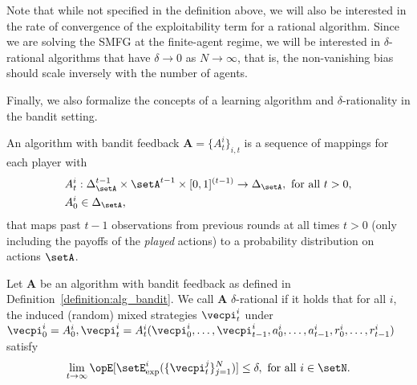 Note that while not specified in the definition above, we will also be interested in the rate of convergence of the exploitability term for a rational algorithm.
Since we are solving the SMFG at the finite-agent regime, we will be interested in $\delta$-rational algorithms that have $\delta \rightarrow 0$ as $N\rightarrow\infty$, that is, the non-vanishing bias should scale inversely with the number of agents.

Finally, we also formalize the concepts of a learning algorithm and $\delta$-rationality in the bandit setting.

\begin{definition}
\label{definition:alg_bandit}
An algorithm with bandit feedback $\mathbf{A} = \{ A_t^i\}_{i,t}$ is a sequence of mappings for each player with
\begin{align*}
    &A_t^i : \Delta_\setA^{t-1} \times \setA^{t-1} \times [0,1]^{(t-1) } \rightarrow \Delta_\setA, \text{ for all $t > 0$}, \\
    &A_0^i \in \Delta_\setA,
\end{align*}
that maps past $t-1$ observations from previous rounds at all times $t > 0$ (only including the payoffs of the \emph{played} actions) to a probability distribution on actions $\setA$.
\end{definition}

\begin{definition}
Let $\mathbf{A}$ be an algorithm with bandit feedback as defined in Definition~\ref{definition:alg_bandit}.
We call $\mathbf{A}$ $\delta$-rational if it holds that for all $i$, the induced (random) mixed strategies $\vecpi_t^i$ under $\vecpi_0^i = A_0^i, \vecpi_t^i = A_t^i(\vecpi^i_0, \ldots, \vecpi_{t-1}^i, a_0^i, \ldots, a_{t-1}^i, r_{0}^i, \ldots, r_{t-1}^i)$ satisfy
\begin{align*}
    \lim_{t\rightarrow \infty} \Exop[ \setE^i_{\text{exp}}(\{\vecpi_t^j \}_{j=1}^N)] \leq \delta, \text{ for all } i \in \setN.
\end{align*}
\end{definition}

